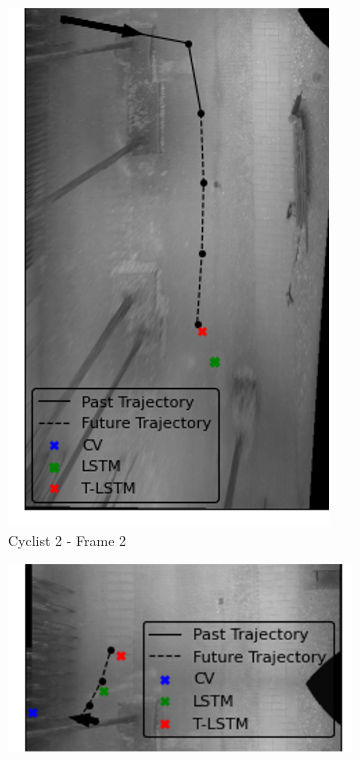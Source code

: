 \documentclass{article}
\begin{document}
\begin{figure}[H]
\begin{subfigure}{0.4\textwidth}
  \includegraphics[width=\linewidth]{quali_results/cyc-3-2.png}
  \caption{Cyclist 2 - Frame 2}
  \label{fig:cyc2-2}
\end{subfigure}
\begin{subfigure}{0.4\textwidth}
  \centering
  \includegraphics[width=\linewidth]{quali_results/cyc-4-1.png}

\end{subfigure}
\end{figure}
\end{document}

